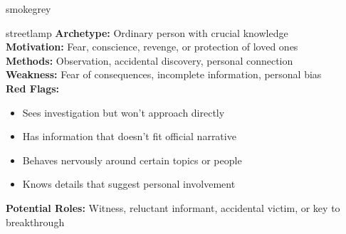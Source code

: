 \documentclass[11pt]{article}
\begin{document}
\begin{noirsection}{smokegrey}
\begin{suspectbox}{streetlamp}
\textbf{Archetype:} Ordinary person with crucial knowledge\\
\textbf{Motivation:} Fear, conscience, revenge, or protection of loved ones\\
\textbf{Methods:} Observation, accidental discovery, personal connection\\
\textbf{Weakness:} Fear of consequences, incomplete information, personal bias\\
\textbf{Red Flags:}
\begin{itemize}
    \item Sees investigation but won't approach directly
    \item Has information that doesn't fit official narrative
    \item Behaves nervously around certain topics or people
    \item Knows details that suggest personal involvement
\end{itemize}
\textbf{Potential Roles:} Witness, reluctant informant, accidental victim, or key to breakthrough
\end{suspectbox}
\end{noirsection}

\newpage
\end{document}
